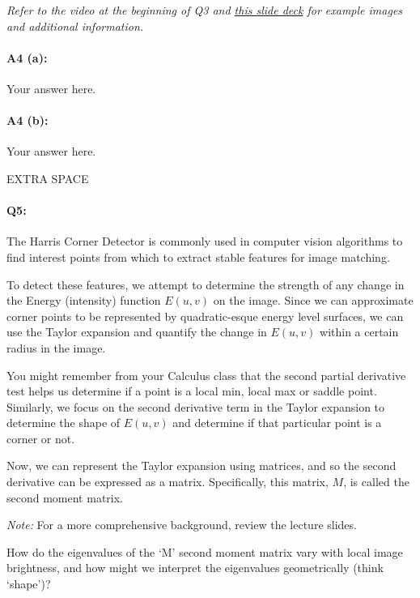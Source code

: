 \emph{Refer to the video at the beginning of Q3 and \href{http://biometrics.cse.msu.edu/Presentations/AnilJain_UniquenessOfFingerprints_NAS05.pdf}{this slide deck} for example images and additional information.}

\paragraph{A4 (a):} Your answer here.

\paragraph{A4 (b):} Your answer here.
\pagebreak


EXTRA SPACE
\pagebreak




\pagebreak
\paragraph{Q5:} 
The Harris Corner Detector is commonly used in computer vision algorithms to find interest points from which to extract stable features for image matching.

To detect these features, we attempt to determine the strength of any change in the Energy (intensity) function $E(u, v)$ on the image. Since we can approximate corner points to be represented by quadratic-esque energy level surfaces, we can use the Taylor expansion and quantify the change in $E(u, v)$ within a certain radius in the image.

You might remember from your Calculus class that the second partial derivative test helps us determine if a point is a local min, local max or saddle point. Similarly, we focus on the second derivative term in the Taylor expansion to determine the shape of $E(u, v)$ and determine if that particular point is a corner or not.

Now, we can represent the Taylor expansion using matrices, and so the second derivative can be expressed as a matrix. Specifically, this matrix, $M$, is called the second moment matrix.

\textit{Note:} For a more comprehensive background, review the lecture slides.

How do the eigenvalues of the `M' second moment matrix vary with local image brightness, and how might we interpret the eigenvalues geometrically (think `shape')?


